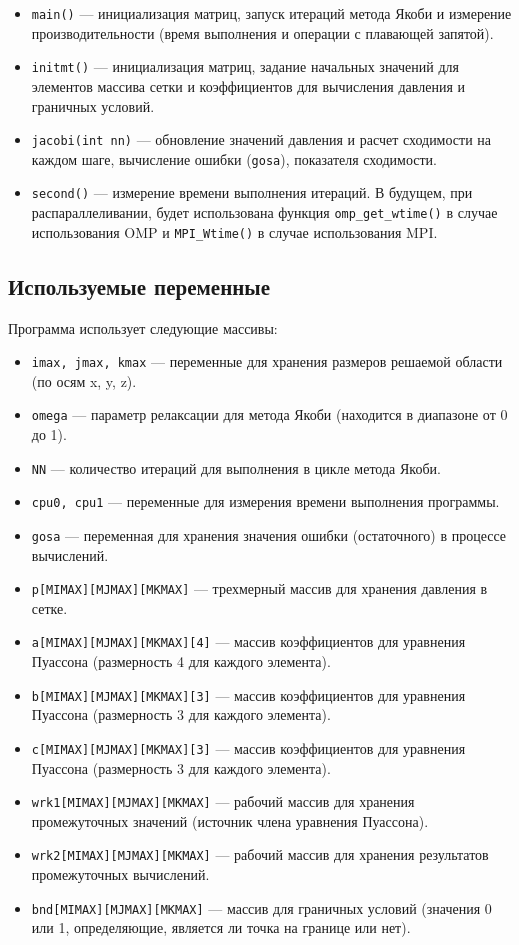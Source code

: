 \documentclass[a4paper, 11pt]{article}
\begin{document}
\begin{itemize}
    \item \texttt{main()} — инициализация матриц, запуск итераций метода Якоби и измерение производительности (время выполнения и операции с плавающей запятой).
    \item \texttt{initmt()} — инициализация матриц, задание начальных значений для элементов массива сетки и коэффициентов для вычисления давления и граничных условий.
    \item \texttt{jacobi(int nn)} — обновление значений давления и расчет сходимости на каждом шаге, вычисление ошибки (\texttt{gosa}), показателя сходимости.
    \item \texttt{second()} — измерение времени выполнения итераций. В будущем, при распараллеливании, будет использована функция \texttt{omp\_get\_wtime()} в случае использования OMP и \texttt{MPI\_Wtime()} в случае использования MPI.
\end{itemize}

\subsection*{Используемые переменные}

Программа использует следующие массивы:

\begin{itemize}
    \item \texttt{imax, jmax, kmax} — переменные для хранения размеров решаемой области (по осям x, y, z).
    \item \texttt{omega} — параметр релаксации для метода Якоби (находится в диапазоне от 0 до 1).
    \item \texttt{NN} — количество итераций для выполнения в цикле метода Якоби.
    \item \texttt{cpu0, cpu1} — переменные для измерения времени выполнения программы.
    \item \texttt{gosa} — переменная для хранения значения ошибки (остаточного) в процессе вычислений.
    \item \texttt{p[MIMAX][MJMAX][MKMAX]} — трехмерный массив для хранения давления в сетке.
    \item \texttt{a[MIMAX][MJMAX][MKMAX][4]} — массив коэффициентов для уравнения Пуассона (размерность 4 для каждого элемента).
    \item \texttt{b[MIMAX][MJMAX][MKMAX][3]} — массив коэффициентов для уравнения Пуассона (размерность 3 для каждого элемента).
    \item \texttt{c[MIMAX][MJMAX][MKMAX][3]} — массив коэффициентов для уравнения Пуассона (размерность 3 для каждого элемента).
    \item \texttt{wrk1[MIMAX][MJMAX][MKMAX]} — рабочий массив для хранения промежуточных значений (источник члена уравнения Пуассона).
    \item \texttt{wrk2[MIMAX][MJMAX][MKMAX]} — рабочий массив для хранения результатов промежуточных вычислений.
    \item \texttt{bnd[MIMAX][MJMAX][MKMAX]} — массив для граничных условий (значения 0 или 1, определяющие, является ли точка на границе или нет).
\end{itemize}
\end{document}
